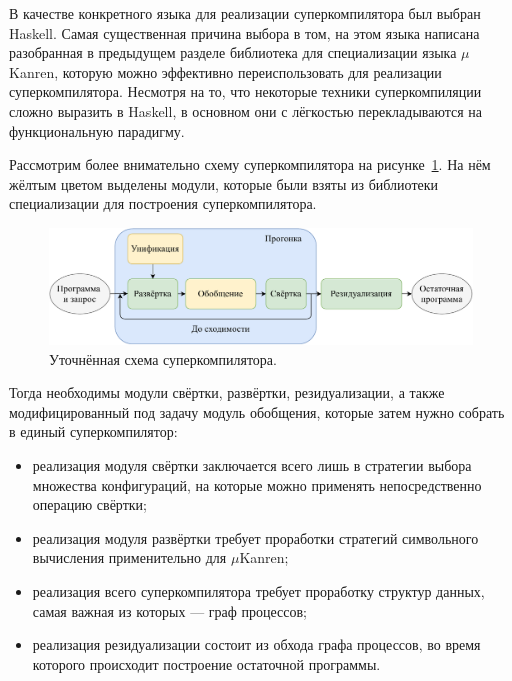В качестве конкретного языка для реализации суперкомпилятора был выбран Haskell.
Самая существенная причина выбора в том, на этом языка написана разобранная
в предыдущем разделе библиотека для специализации языка $\mu$Kanren, которую
можно эффективно переиспользовать для реализации суперкомпилятора.
Несмотря на то, что некоторые техники суперкомпиляции сложно выразить
в Haskell, в основном они
с лёгкостью перекладываются на функциональную парадигму.

Рассмотрим более внимательно схему суперкомпилятора на рисунке~\ref{fig:scompWork}.
На нём жёлтым цветом выделены модули, которые были взяты из библиотеки
специализации для построения суперкомпилятора.

\begin{figure}[h!]
\center
\includegraphics[scale=0.75]{sc/scompflow.pdf}
\caption{Уточнённая схема суперкомпилятора.}
\label{fig:scompWork}
\end{figure}

Тогда необходимы модули  свёртки, развёртки, резидуализации,
а также модифицированный под задачу модуль обобщения, которые затем
нужно собрать в единый суперкомпилятор:
\begin{itemize}

\item реализация модуля свёртки заключается всего лишь в стратегии выбора множества
      конфигураций, на которые можно применять непосредственно операцию свёртки;

\item реализация модуля развёртки требует проработки стратегий символьного вычисления
      применительно для $\mu$Kanren;
\item реализация всего суперкомпилятора требует проработку структур данных, самая
      важная из которых --- граф процессов;
\item реализация резидуализации состоит из обхода графа процессов, во время
      которого происходит построение остаточной программы.
\end{itemize}

